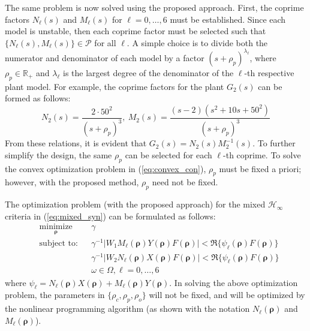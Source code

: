 \documentclass[letterpaper, 10 pt, conference]{ieeeconf}  %
\begin{document}
The same problem is now solved using the proposed approach. First, the coprime factors $N_{\ell}(s)$ and $M_{\ell}(s)$ for ${\ell} = 0,\ldots,6$ must be established. Since each model is unstable, then each coprime factor must be selected such that $\{N_{\ell}(s),M_{\ell}(s) \}  \in \mathscr{P}$ for all ${\ell}$. A simple choice is to divide both the numerator and denominator of each model by a factor $(s+\rho_p)^{\lambda_{\ell}}$, where $\rho_p \in \mathbb{R}_+$ and ${\lambda_{\ell}}$ is the largest degree of the denominator of the $\ell$-th respective plant model. For example, the coprime factors for the plant $G_2(s)$ can be formed as follows:
\begin{equation}
N_2(s) = \frac{2 \cdot 50^2 }{(s+\rho_p)^3}, \ M_2(s) = \frac{(s-2)(s^2+10s+50^2) }{(s+\rho_p)^3}
\end{equation}
From these relations, it is evident that $G_2(s) = N_2(s)M_2^{-1}(s)$. To further simplify the design, the same $\rho_p$ can be selected for each $\ell$-th coprime. To solve the convex optimization problem in (\ref{eq:convex_con}), $\rho_p$ must be fixed a priori; however, with the proposed method, $\rho_p$ need not be fixed. 

The optimization problem (with the proposed approach) for the mixed $\mathcal{H}_\infty$ criteria in (\ref{eq:mixed_syn}) can be formulated as follows:
\begin{equation} \label{eq:opt_true_ex3}
\begin{aligned}
& \underset{ \bm{\rho}}{\text{minimize}}
& & \gamma  \\
& \text{subject to:} & & \gamma^{-1} |W_1M_{\ell}(\bm{\rho})Y(\bm{\rho})F(\bm{\rho})| < \Re\{\psi_{\ell}(\bm{\rho}) F(\bm{\rho})\} \\ 
& & &  \gamma^{-1} |W_2N_{\ell}(\bm{\rho})X(\bm{\rho})F(\bm{\rho})| < \Re\{\psi_{\ell}(\bm{\rho}) F(\bm{\rho})\}   \\ 
& & & \omega \in \Omega, \ell = 0,\ldots,6
\end{aligned}
\end{equation}
where $\psi_{\ell} = N_{\ell}(\bm{\rho})X(\bm{\rho}) + M_{\ell}(\bm{\rho})Y(\bm{\rho})$. In solving the above optimization problem, the parameters in $\{\rho_c,\rho_p,\rho_o \}$ will not be fixed, and will be optimized by the nonlinear programming algorithm (as shown with the notation $N_{\ell}(\bm{\rho})$ and $M_{\ell}(\bm{\rho})$). 
\end{document}
